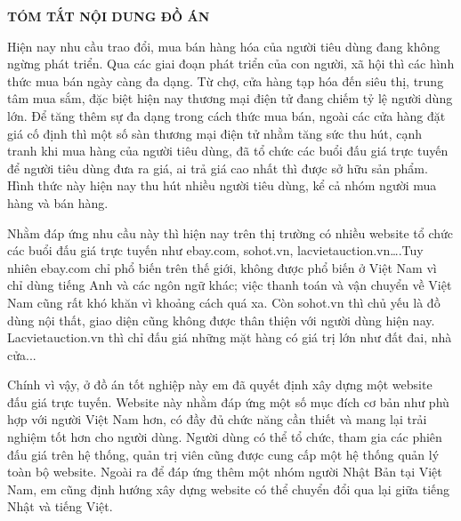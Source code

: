 \documentclass[../DoAn.tex]{subfiles}
\begin{document}
\begin{center}
    \Large{\textbf{TÓM TẮT NỘI DUNG ĐỒ ÁN}}\\
\end{center}
\vspace{1cm}
Hiện nay nhu cầu trao đổi, mua bán hàng hóa của người tiêu dùng đang không ngừng phát triển. Qua các giai đoạn phát triển của con người, xã hội thì các hình thức mua bán ngày càng đa dạng. Từ chợ, cửa hàng tạp hóa đến siêu thị, trung tâm mua sắm, đặc biệt hiện nay thương mại điện tử đang chiếm tỷ lệ người dùng lớn. Để tăng thêm sự đa dạng trong cách thức mua bán, ngoài các cửa hàng đặt giá cố định thì một số sàn thương mại điện tử nhằm tăng sức thu hút, cạnh tranh khi mua hàng của người tiêu dùng, đã tổ chức các buổi đấu giá trực tuyến để người tiêu dùng đưa ra giá, ai trả giá cao nhất thì được sở hữu sản phẩm. Hình thức này hiện nay thu hút nhiều người tiêu dùng, kể cả nhóm người mua hàng và bán hàng.

Nhằm đáp ứng nhu cầu này thì hiện nay trên thị trường có nhiều website tổ chức các buổi đấu giá trực tuyến như ebay.com, sohot.vn, lacvietauction.vn….Tuy nhiên ebay.com chỉ phổ biến trên thế giới, không được phổ biến ở Việt Nam vì chỉ dùng tiếng Anh và các ngôn ngữ khác; việc thanh toán và vận chuyển về Việt Nam cũng rất khó khăn vì khoảng cách quá xa. Còn sohot.vn thì chủ yếu là đồ dùng nội thất, giao diện cũng không được thân thiện với người dùng hiện nay. Lacvietauction.vn thì chỉ đấu giá những mặt hàng có giá trị lớn như đất đai, nhà cửa...

Chính vì vậy, ở đồ án tốt nghiệp này em đã quyết định xây dựng một website đấu giá trực tuyến. Website này nhằm đáp ứng một số mục đích cơ bản như phù hợp với người Việt Nam hơn, có đầy đủ chức năng cần thiết và mang lại trải nghiệm tốt hơn cho người dùng. Người dùng có thể tổ chức, tham gia các phiên đấu giá trên hệ thống, quản trị viên cũng được cung cấp một hệ thống quản lý toàn bộ website. Ngoài ra để đáp ứng thêm một nhóm người Nhật Bản tại Việt Nam, em cũng định hướng xây dựng website có thể chuyển đổi  qua lại giữa tiếng Nhật và tiếng Việt.
\end{document}
